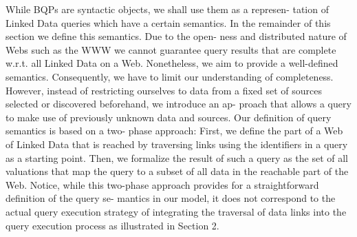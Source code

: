 \iffalse
In the context of the World Wide Web (WWW), defining completeness based on results is not possible because it necessitate the acquisition of the whole web.
However, in the context of a decentralized dataset with structural properties and associated structural assumptions,
the traversal completeness of those datasets is defined outside of the query engine and thus can serve as a 
stable comparison concept regardless of the traversal policy of the engine.
Hence, for each dataset with structural properties, it is possible to compute a theoretical result completeness.
If we suppose a finite network of connected datasets that are discoverable with a specified reachability criterion such as \texttt{cmatch},
Then, it is possible to establish the completeness of the subset of the query targeting information in the network.



Furthermore, having a stable traversal completeness we can create a theorical results completeness metric, by considering the descentralized dataset as a centralized one that is the union 
of all the knowledge graph inside the ressources of the dataset $GD = \bigcup\limits_{i}^{n} g\in r_i$ given $n$ ressource $r$.
This, metric 

\begin{equation}\label{eq:metricResult}
   [\![ Q ]\!]^{G^{\prime}} = [\![ Q ]\!]^{G}
\end{equation}

\fi 



\iffalse
While BQPs are syntactic objects, we shall use them as a represen-
tation of Linked Data queries which have a certain semantics. In the
remainder of this section we define this semantics. Due to the open-
ness and distributed nature of Webs such as the WWW we cannot
guarantee query results that are complete w.r.t. all Linked Data on
a Web. Nonetheless, we aim to provide a well-defined semantics.
Consequently, we have to limit our understanding of completeness.
However, instead of restricting ourselves to data from a fixed set
of sources selected or discovered beforehand, we introduce an ap-
proach that allows a query to make use of previously unknown data
and sources. Our definition of query semantics is based on a two-
phase approach: First, we define the part of a Web of Linked Data
that is reached by traversing links using the identifiers in a query
as a starting point. Then, we formalize the result of such a query
as the set of all valuations that map the query to a subset of all
data in the reachable part of the Web. Notice, while this two-phase
approach provides for a straightforward definition of the query se-
mantics in our model, it does not correspond to the actual query
execution strategy of integrating the traversal of data links into the
query execution process as illustrated in Section 2.


